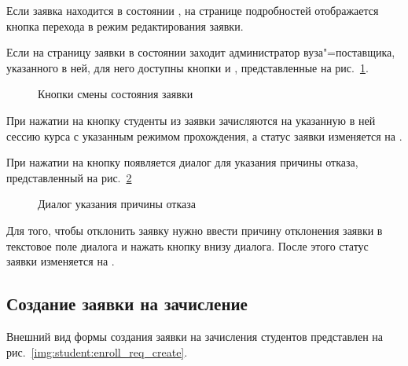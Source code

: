 Если заявка находится в состоянии , на странице подробностей 
отображается кнопка перехода в режим редактирования заявки. 

Если на страницу заявки в состоянии  заходит администратор вуза"=поставщика, 
указанного в ней, для него доступны кнопки  и , 
представленные на рис.~\ref{img:student:change_mode_req_detail_buttons}.
\begin{figure}[H]
	\caption{Кнопки смены состояния заявки}
	\label{img:student:change_mode_req_detail_buttons}
\end{figure}

При нажатии на кнопку  студенты из заявки зачисляются на указанную в ней сессию курса 
с указанным режимом прохождения, а статус заявки изменяется на .

При нажатии на кнопку  появляется диалог для указания причины отказа, 
представленный на рис.~\ref{img:student:change_mode_req_detail_decline}
\begin{figure}[H]
	\caption{Диалог указания причины отказа}
	\label{img:student:change_mode_req_detail_decline}
\end{figure}
Для того, чтобы отклонить заявку нужно ввести причину отклонения заявки в текстовое поле диалога 
и нажать кнопку  внизу диалога. После этого статус заявки изменяется на .


\subsection{Создание заявки на зачисление}
Внешний вид формы создания заявки на зачисления студентов представлен на рис.~\ref{img:student:enroll_req_create}.

